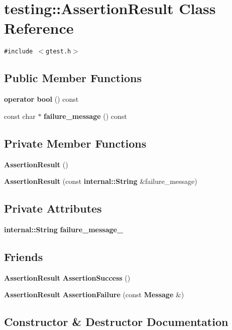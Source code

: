 \section{testing::AssertionResult Class Reference}
\label{classtesting_1_1AssertionResult}
{\tt \#include $<$gtest.h$>$}

\subsection*{Public Member Functions}
\begin{CompactItemize}
\item 
{\bf operator bool} () const
\item 
const char $\ast$ {\bf failure\_\-message} () const
\end{CompactItemize}
\subsection*{Private Member Functions}
\begin{CompactItemize}
\item 
{\bf AssertionResult} ()
\item 
{\bf AssertionResult} (const {\bf internal::String} \&failure\_\-message)
\end{CompactItemize}
\subsection*{Private Attributes}
\begin{CompactItemize}
\item 
{\bf internal::String} {\bf failure\_\-message\_\-}
\end{CompactItemize}
\subsection*{Friends}
\begin{CompactItemize}
\item 
{\bf AssertionResult} {\bf AssertionSuccess} ()
\item 
{\bf AssertionResult} {\bf AssertionFailure} (const {\bf Message} \&)
\end{CompactItemize}


\subsection{Constructor \& Destructor Documentation}

